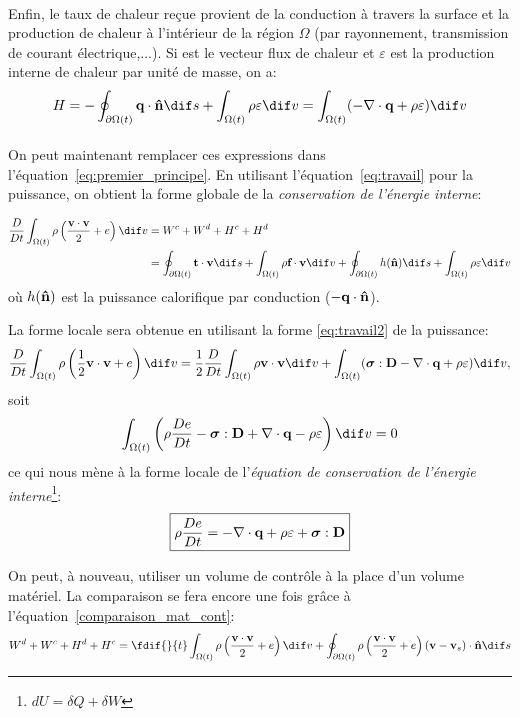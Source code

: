 \paragraph{}
Enfin, le taux de chaleur reçue provient de la conduction à travers la surface et la production de chaleur à l'intérieur de la région $\Omega$ (par rayonnement, transmission de courant électrique,...). Si  est le vecteur flux de chaleur et $\varepsilon$ est la production interne de chaleur par unité de masse, on a:
$$H=-\oint_{\partial \Omega (t)}\fv{q}\cdot\fv{\^n} \dif s+\int_{\Omega(t)}\rho\varepsilon \dif v=\int_{\Omega (t)}(-\nabla\cdot\fv{q}+\rho\varepsilon) \dif v$$
\paragraph{}
On peut maintenant remplacer ces expressions dans l'équation~\eqref{eq:premier_principe}.
En utilisant l'équation~\eqref{eq:travail} pour la puissance,
on obtient la forme globale de la \emph{conservation de l'énergie interne}:

\begin{align}
\frac{D}{Dt}\int_{\Omega (t)}\rho\left(\frac{\fv{v}\cdot\fv{v}}{2}+e\right) \dif v&= W^c+W^d+H^c+H^d\\
 &=\oint_{\partial \Omega (t)}\fv{t}\cdot\fv{v} \dif s+\int_{\Omega (t)}\rho\fv{f}\cdot\fv{v} \dif v+\oint_{\partial \Omega (t)}h(\fv{\^n}) \dif s+\int_{\Omega (t)}\rho\varepsilon \dif v
\end{align}
où $h(\textbf{\^n})$ est la puissance calorifique par conduction ($-\textbf{q}\cdot\textbf{\^n}$).

La forme locale sera obtenue en utilisant la forme \ref{eq:travail2} de la puissance:
$$\frac{D}{Dt}\int_{\Omega  (t)}\rho\left(\frac{1}{2}\fv{v}\cdot\fv{v}+e\right) \dif v=\frac{1}{2}\frac{D}{Dt}\int_{\Omega (t)}\rho\fv{v}\cdot\fv{v} \dif v+\int_{\Omega (t)}(\boldsymbol{\sigma}:\fv{D}-\nabla\cdot\fv{q}+\rho\varepsilon) \dif v,$$
soit
$$\int_{\Omega (t)}\left(\rho\frac{De}{Dt}-\boldsymbol{\sigma}:\fv{D}+\nabla\cdot\fv{q}-\rho\varepsilon\right) \dif v=0$$
ce qui nous mène à la forme locale de l'\emph{équation de conservation de l'énergie interne}\footnote{$dU=\delta Q+\delta W$}:
$$\boxed{\rho\frac{De}{Dt}=-\nabla\cdot\textbf{q}+\rho\varepsilon+\boldsymbol{\sigma}:\textbf{D}}$$

On peut, à nouveau, utiliser un volume de contrôle à la place d'un volume matériel. La comparaison se fera encore une fois grâce à l'équation~\eqref{comparaison_mat_cont}:
\begin{equation}\label{energie_cont}W^d+W^c+H^d+H^c=\fdif{}{t}\int_{\Omega (t)}\rho\left(\frac{\fv{v}\cdot\fv{v}}{2}+e\right) \dif v+\oint_{\partial\Omega (t)}\rho\left(\frac{\fv{v}\cdot\fv{v}}{2}+e\right)(\fv{v}-\fv{v}_s)\cdot\fv{\^n} \dif s\end{equation}

